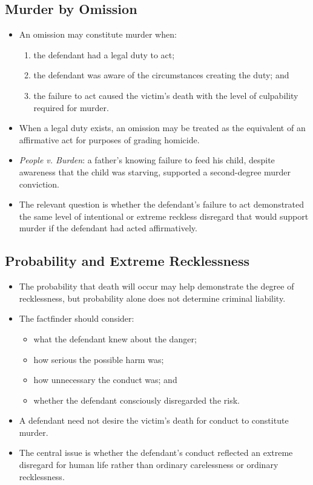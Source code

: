\documentclass[11pt]{tex/lawoutline}
\begin{document}
\subsection{Murder by Omission}
\begin{itemize}
    \item An omission may constitute murder when:
    \begin{enumerate}
        \item the defendant had a legal duty to act;
        \item the defendant was aware of the circumstances creating the duty; and
        \item the failure to act caused the victim's death with the level of culpability required for murder.
    \end{enumerate}
    \item When a legal duty exists, an omission may be treated as the equivalent of an affirmative act for purposes of grading homicide.
    \item \textit{People v. Burden}: a father's knowing failure to feed his child, despite awareness that the child was starving, supported a second-degree murder conviction.
    \item The relevant question is whether the defendant's failure to act demonstrated the same level of intentional or extreme reckless disregard that would support murder if the defendant had acted affirmatively.
\end{itemize}

\subsection{Probability and Extreme Recklessness}
\begin{itemize}
    \item The probability that death will occur may help demonstrate the degree of recklessness, but probability alone does not determine criminal liability.
    \item The factfinder should consider:
    \begin{itemize}
        \item what the defendant knew about the danger;
        \item how serious the possible harm was;
        \item how unnecessary the conduct was; and
        \item whether the defendant consciously disregarded the risk.
    \end{itemize}
    \item A defendant need not desire the victim's death for conduct to constitute murder.
    \item The central issue is whether the defendant's conduct reflected an extreme disregard for human life rather than ordinary carelessness or ordinary recklessness.
\end{itemize}
\end{document}
